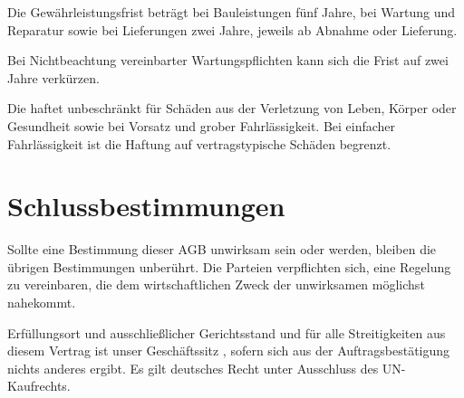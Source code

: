 \documentclass[fontsize=12pt,parskip=half]{scrartcl}
\begin{document}
\begin{contract}
\Clause[title={Verjährung}]

Die Gewährleistungsfrist beträgt bei Bauleistungen fünf Jahre, bei Wartung und Reparatur sowie bei Lieferungen zwei Jahre, jeweils ab Abnahme oder Lieferung. 

Bei Nichtbeachtung vereinbarter Wartungspflichten kann sich die Frist auf zwei Jahre verkürzen.

\Clause[title={Haftung}]

Die \companyName{} haftet unbeschränkt für Schäden aus der Verletzung von Leben, Körper oder Gesundheit sowie bei Vorsatz und grober Fahrlässigkeit. Bei einfacher Fahrlässigkeit ist die Haftung auf vertragstypische Schäden begrenzt.

\end{contract}

\section{Schlussbestimmungen}

\begin{contract}

Sollte eine Bestimmung dieser AGB unwirksam sein oder werden, bleiben die übrigen Bestimmungen unberührt. Die Parteien verpflichten sich, eine Regelung zu vereinbaren, die dem wirtschaftlichen Zweck der unwirksamen möglichst nahekommt.

Erfüllungsort und ausschließlicher Gerichtsstand und für alle Streitigkeiten aus diesem Vertrag ist unser Geschäftssitz \companyLocation{}, sofern sich aus der Auftragsbestätigung nichts anderes ergibt. Es gilt deutsches Recht unter Ausschluss des UN-Kaufrechts.

\end{contract}
\end{document}
